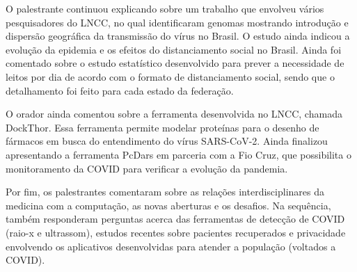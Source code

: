 O palestrante continuou explicando sobre um trabalho que envolveu vários pesquisadores do LNCC, no qual identificaram genomas mostrando introdução e dispersão geográfica da transmissão do vírus no Brasil. O estudo ainda indicou a evolução da epidemia e os efeitos do distanciamento social no Brasil. Ainda foi comentado sobre o estudo estatístico desenvolvido para prever a necessidade de leitos por dia de acordo com o formato de distanciamento social, sendo que o detalhamento foi feito para cada estado da federação.

O orador ainda comentou sobre a ferramenta desenvolvida no LNCC, chamada DockThor. Essa ferramenta permite modelar proteínas para o desenho de fármacos em busca do entendimento do vírus SARS-CoV-2. Ainda finalizou apresentando a ferramenta PcDars em parceria com a Fio Cruz, que possibilita o monitoramento da COVID para verificar a evolução da pandemia.

Por fim, os palestrantes comentaram sobre as relações interdisciplinares da medicina com a computação, as novas aberturas e os desafios. Na sequência, também responderam perguntas acerca das ferramentas de detecção de COVID (raio-x e ultrassom), estudos recentes sobre pacientes recuperados e privacidade envolvendo os aplicativos desenvolvidas para atender a população (voltados a COVID).
